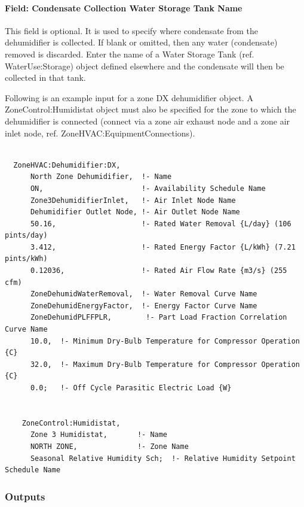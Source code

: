 \paragraph{Field: Condensate Collection Water Storage Tank Name}\label{field-condensate-collection-water-storage-tank-name-000}

This field is optional. It is used to specify where condensate from the dehumidifier is collected. If blank or omitted, then any water (condensate) removed is discarded. Enter the name of a Water Storage Tank (ref. WaterUse:Storage) object defined elsewhere and the condensate will then be collected in that tank.

Following is an example input for a zone DX dehumidifier object. A ZoneControl:Humidistat object must also be specified for the zone to which the dehumidifier is connected (connect via a zone air exhaust node and a zone air inlet node, ref. ZoneHVAC:EquipmentConnections).

\begin{lstlisting}

  ZoneHVAC:Dehumidifier:DX,
      North Zone Dehumidifier,  !- Name
      ON,                       !- Availability Schedule Name
      Zone3DehumidifierInlet,   !- Air Inlet Node Name
      Dehumidifier Outlet Node, !- Air Outlet Node Name
      50.16,                    !- Rated Water Removal {L/day} (106 pints/day)
      3.412,                    !- Rated Energy Factor {L/kWh} (7.21 pints/kWh)
      0.12036,                  !- Rated Air Flow Rate {m3/s} (255 cfm)
      ZoneDehumidWaterRemoval,  !- Water Removal Curve Name
      ZoneDehumidEnergyFactor,  !- Energy Factor Curve Name
      ZoneDehumidPLFFPLR,        !- Part Load Fraction Correlation Curve Name
      10.0,  !- Minimum Dry-Bulb Temperature for Compressor Operation {C}
      32.0,  !- Maximum Dry-Bulb Temperature for Compressor Operation {C}
      0.0;   !- Off Cycle Parasitic Electric Load {W}


    ZoneControl:Humidistat,
      Zone 3 Humidistat,       !- Name
      NORTH ZONE,              !- Zone Name
      Seasonal Relative Humidity Sch;  !- Relative Humidity Setpoint Schedule Name
\end{lstlisting}

\subsubsection{Outputs}\label{outputs-10-008}


